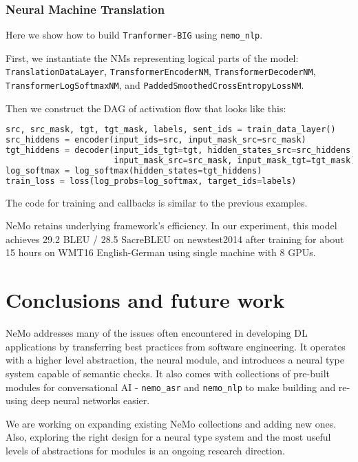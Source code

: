 \documentclass{article}
\begin{document}
\subsubsection{Neural Machine Translation}
Here we show how to build \texttt{Tranformer-BIG} \cite{vaswani2017} using \texttt{nemo\_nlp}.

First, we instantiate the NMs representing logical parts of the model: \texttt{TranslationDataLayer}, \texttt{TransformerEncoderNM}, \texttt{TransformerDecoderNM}, \texttt{TransformerLogSoftmaxNM}, and \texttt{PaddedSmoothedCrossEntropyLossNM}.



Then we construct the DAG of activation flow that looks like this:
\begin{lstlisting}[language=Python, basicstyle=\small]
src, src_mask, tgt, tgt_mask, labels, sent_ids = train_data_layer()
src_hiddens = encoder(input_ids=src, input_mask_src=src_mask)
tgt_hiddens = decoder(input_ids_tgt=tgt, hidden_states_src=src_hiddens,
                      input_mask_src=src_mask, input_mask_tgt=tgt_mask)
log_softmax = log_softmax(hidden_states=tgt_hiddens)
train_loss = loss(log_probs=log_softmax, target_ids=labels)
\end{lstlisting}
The code for training and callbacks is similar to the previous examples.

NeMo retains underlying framework's efficiency. In our experiment, this model achieves 29.2 BLEU / 28.5 SacreBLEU on newstest2014 after training for about 15 hours on WMT16 English-German using single machine with 8 GPUs.

\section{Conclusions and future work}\label{conclusions}
NeMo addresses many of the issues often encountered in developing DL applications by transferring best practices from software engineering. It operates with a higher level abstraction, the neural module, and introduces a neural type system capable of semantic checks. It also comes with collections of pre-built modules for conversational AI - \texttt{nemo\_asr} and \texttt{nemo\_nlp} to make building and re-using deep neural networks easier. 

We are working on expanding existing NeMo collections and adding new ones. Also, exploring the right design for a neural type system and the most useful levels of abstractions for modules is an ongoing research direction.



\end{document}
